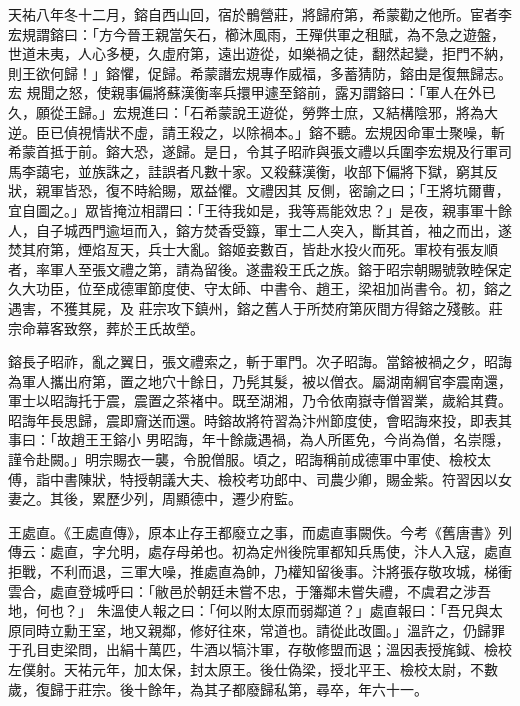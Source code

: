 \begin{pinyinscope}
 天祐八年冬十二月，鎔自西山回，宿於鶻營莊，將歸府第，希蒙勸之他所。宦者李宏規謂鎔曰：「方今晉王親當矢石，櫛沐風雨，王殫供軍之租賦，為不急之遊盤，世道未夷，人心多梗，久虛府第，遠出遊從，如樂禍之徒，翻然起變，拒門不納，則王欲何歸！」鎔懼，促歸。希蒙譖宏規專作威福，多蓄猜防，鎔由是復無歸志。宏
 規聞之怒，使親事偏將蘇漢衡率兵擐甲遽至鎔前，露刃謂鎔曰：「軍人在外已久，願從王歸。」宏規進曰：「石希蒙說王遊從，勞弊士庶，又結構陰邪，將為大逆。臣已偵視情狀不虛，請王殺之，以除禍本。」鎔不聽。宏規因命軍士聚噪，斬希蒙首抵于前。鎔大恐，遂歸。是日，令其子昭祚與張文禮以兵圍李宏規及行軍司馬李藹宅，並族誅之，詿誤者凡數十家。又殺蘇漢衡，收部下偏將下獄，窮其反狀，親軍皆恐，復不時給賜，眾益懼。文禮因其
 反側，密諭之曰；「王將坑爾曹，宜自圖之。」眾皆掩泣相謂曰：「王待我如是，我等焉能效忠？」是夜，親事軍十餘人，自子城西門逾垣而入，鎔方焚香受籙，軍士二人突入，斷其首，袖之而出，遂焚其府第，煙焰亙天，兵士大亂。鎔姬妾數百，皆赴水投火而死。軍校有張友順者，率軍人至張文禮之第，請為留後。遂盡殺王氏之族。鎔于昭宗朝賜號敦睦保定久大功臣，位至成德軍節度使、守太師、中書令、趙王，梁祖加尚書令。初，鎔之遇害，不獲其屍，及
 莊宗攻下鎮州，鎔之舊人于所焚府第灰間方得鎔之殘骸。莊宗命幕客致祭，葬於王氏故塋。



 鎔長子昭祚，亂之翼日，張文禮索之，斬于軍門。次子昭誨。當鎔被禍之夕，昭誨為軍人攜出府第，置之地穴十餘日，乃髡其髮，被以僧衣。屬湖南綱官李震南還，軍士以昭誨托于震，震置之茶褚中。既至湖湘，乃令依南嶽寺僧習業，歲給其費。昭誨年長思歸，震即齎送而還。時鎔故將符習為汴州節度使，會昭誨來投，即表其事曰：「故趙王王鎔小
 男昭誨，年十餘歲遇禍，為人所匿免，今尚為僧，名崇隱，謹令赴闕。」明宗賜衣一襲，令脫僧服。頃之，昭誨稱前成德軍中軍使、檢校太傅，詣中書陳狀，特授朝議大夫、檢校考功郎中、司農少卿，賜金紫。符習因以女妻之。其後，累歷少列，周顯德中，遷少府監。



 王處直。《王處直傳》，原本止存王都廢立之事，而處直事闕佚。今考《舊唐書》列傳云：處直，字允明，處存母弟也。初為定州後院軍都知兵馬使，汴人入寇，處直拒戰，不利而退，三軍大噪，推處直為帥，乃權知留後事。汴將張存敬攻城，梯衝雲合，處直登城呼曰：「敝邑於朝廷未嘗不忠，于籓鄰未嘗失禮，不虞君之涉吾地，何也？」
 朱溫使人報之曰：「何以附太原而弱鄰道？」處直報曰：「吾兄與太原同時立勳王室，地又親鄰，修好往來，常道也。請從此改圖。」溫許之，仍歸罪于孔目吏梁問，出絹十萬匹，牛酒以犒汴軍，存敬修盟而退；溫因表授旄鉞、檢校左僕射。天祐元年，加太保，封太原王。後仕偽梁，授北平王、檢校太尉，不數歲，復歸于莊宗。後十餘年，為其子都廢歸私第，尋卒，年六十一。




\end{pinyinscope}
